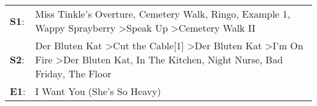 \begin{supertabular}{p{0.03\textwidth}p{0.92\textwidth}}
 \textbf{S1}:  &                                                                                                            Miss Tinkle's Overture\textsuperscript{}, \enspace Cemetery Walk\textsuperscript{}, \enspace Ringo\textsuperscript{}, \enspace Example 1\textsuperscript{}, \enspace Wappy Sprayberry\textsuperscript{} \textgreater \enspace Speak Up\textsuperscript{} \textgreater \enspace Cemetery Walk II\textsuperscript{}  \enspace  \\
 \textbf{S2}:  &  Der Bluten Kat\textsuperscript{} \textgreater \enspace Cut the Cable[1]\textsuperscript{} \textgreater \enspace Der Bluten Kat\textsuperscript{} \textgreater \enspace I'm On Fire\textsuperscript{} \textgreater \enspace Der Bluten Kat\textsuperscript{}, \enspace In The Kitchen\textsuperscript{}, \enspace Night Nurse\textsuperscript{}, \enspace Bad Friday\textsuperscript{}, \enspace The Floor\textsuperscript{}  \enspace  \\
 \textbf{E1}:  &                                                                                                                                                                                                                                                                                                                                                                                I Want You (She's So Heavy)\textsuperscript{}  \enspace  \\
\end{supertabular}
